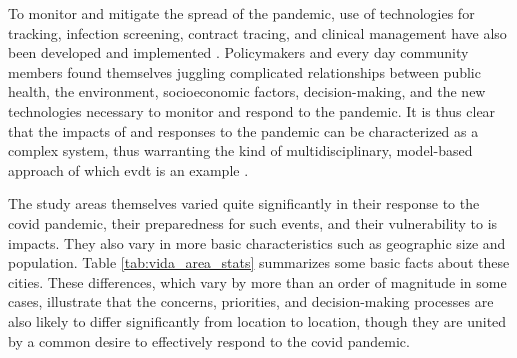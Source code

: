 To monitor and mitigate the spread of the pandemic, use of technologies for tracking, infection screening, contract tracing, and clinical management have also been developed and implemented \cite{whitelawApplicationsDigitalTechnology2020}. Policymakers and every day community members found themselves juggling complicated relationships between public health, the environment, socioeconomic factors, decision-making, and the new technologies necessary to monitor and respond to the pandemic. It is thus clear that the impacts of and responses to the pandemic can be characterized as a complex system, thus warranting the kind of multidisciplinary, model-based approach of which \ac{evdt} is an example \cite{deweckHandlingCOVID192020}.

The study areas themselves varied quite significantly in their response to the \ac{covid} pandemic, their preparedness for such events, and their vulnerability to is impacts. They also vary in more basic characteristics such as geographic size and population. Table \ref{tab:vida_area_stats} summarizes some basic facts about these cities. These differences, which vary by more than an order of magnitude in some cases, illustrate that the concerns, priorities, and decision-making processes are also likely to differ significantly from location to location, though they are united by a common desire to effectively respond to the \ac{covid} pandemic.

